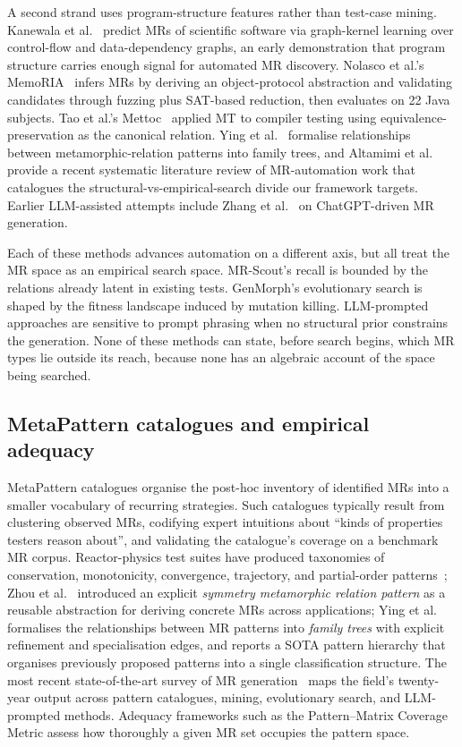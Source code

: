 \documentclass[acmsmall, screen]{acmart}
\begin{document}
A second strand uses program-structure features rather than test-case mining. Kanewala et al.~\cite{Kanewala2016GraphKernel} predict MRs of scientific software via graph-kernel learning over control-flow and data-dependency graphs, an early demonstration that program structure carries enough signal for automated MR discovery. Nolasco et al.'s MemoRIA~\cite{Nolasco2024MemoRIA} infers MRs by deriving an object-protocol abstraction and validating candidates through fuzzing plus SAT-based reduction, then evaluates on 22 Java subjects. Tao et al.'s Mettoc~\cite{Tao2010Mettoc} applied MT to compiler testing using equivalence-preservation as the canonical relation. Ying et al.~\cite{Ying2025MRPatterns} formalise relationships between metamorphic-relation patterns into family trees, and Altamimi et al.~\cite{Altamimi2022MRSLR} provide a recent systematic literature review of MR-automation work that catalogues the structural-vs-empirical-search divide our framework targets. Earlier LLM-assisted attempts include Zhang et al.~\cite{ZhangChatGPTMR2023} on ChatGPT-driven MR generation.

Each of these methods advances automation on a different axis, but all treat the MR space as an empirical search space. MR-Scout's recall is bounded by the relations already latent in existing tests. GenMorph's evolutionary search is shaped by the fitness landscape induced by mutation killing. LLM-prompted approaches are sensitive to prompt phrasing when no structural prior constrains the generation. None of these methods can state, before search begins, which MR types lie outside its reach, because none has an algebraic account of the space being searched.

\subsection{MetaPattern catalogues and empirical adequacy}

MetaPattern catalogues organise the post-hoc inventory of identified MRs into a smaller vocabulary of recurring strategies. Such catalogues typically result from clustering observed MRs, codifying expert intuitions about ``kinds of properties testers reason about'', and validating the catalogue's coverage on a benchmark MR corpus. Reactor-physics test suites have produced taxonomies of conservation, monotonicity, convergence, trajectory, and partial-order patterns~\cite{BellGlasstone1970, LewisMiller1993}; Zhou et al.~\cite{Zhou2020SymmetryMRP} introduced an explicit \emph{symmetry metamorphic relation pattern} as a reusable abstraction for deriving concrete MRs across applications; Ying et al.~\cite{Ying2025MRPatterns} formalises the relationships between MR patterns into \emph{family trees} with explicit refinement and specialisation edges, and reports a SOTA pattern hierarchy that organises previously proposed patterns into a single classification structure. The most recent state-of-the-art survey of MR generation~\cite{LiTOSEM2025} maps the field's twenty-year output across pattern catalogues, mining, evolutionary search, and LLM-prompted methods. Adequacy frameworks such as the Pattern--Matrix Coverage Metric assess how thoroughly a given MR set occupies the pattern space.
\end{document}
